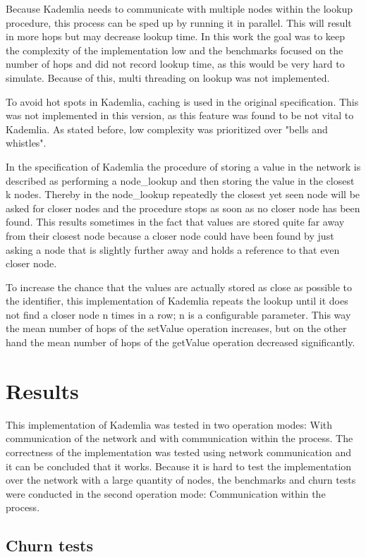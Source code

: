 \documentclass[a4paper, 12pt]{article} %
\begin{document}
Because Kademlia needs to communicate with multiple nodes within the lookup procedure, this process can be sped up by running it in parallel. This will result in more hops but may decrease lookup time. In this work the goal was to keep the complexity of the implementation low and the benchmarks focused on the number of hops and did not record lookup time, as this would be very hard to simulate. Because of this, multi threading on lookup was not implemented. 

To avoid hot spots in Kademlia, caching is used in the original specification. This was not implemented in this version, as this feature was found to be not vital to Kademlia. As stated before, low complexity was prioritized over "bells and whistles".

In the specification of Kademlia the procedure of storing a value in the network is described as performing a node\_lookup and then storing the value in the closest k nodes. Thereby in the node\_lookup repeatedly the closest yet seen node will be asked for closer nodes and the procedure stops as soon as no closer node has been found. This results sometimes in the fact that values are stored quite far away from their closest node because a closer node could have been found by just asking a node that is slightly further away and holds a reference to that even closer node. 

To increase the chance that the values are actually stored as close as possible to the identifier, this implementation of Kademlia repeats the lookup until it does not find a closer node n times in a row; n is a configurable parameter. This way the mean number of hops of the setValue operation increases, but on the other hand the mean number of hops of the getValue operation decreased significantly.

\newpage
\section{Results}

This implementation of Kademlia was tested in two operation modes: With communication of the network and with communication within the process. The correctness of the implementation was tested using network communication and it can be concluded that it works. Because it is hard to test the implementation over the network with a large quantity of nodes, the benchmarks and churn tests were conducted in the second operation mode: Communication within the process.

\subsection{Churn tests}
\end{document}

